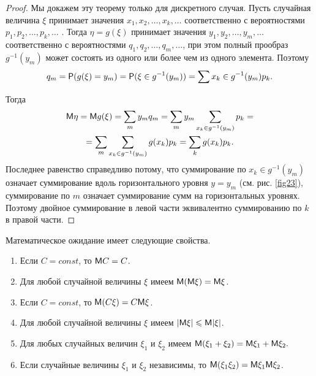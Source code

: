 \begin{proof}
	Мы докажем эту теорему только для дискретного случая.
Пусть случайная величина $\xi$ принимает значения $x_1, x_2,\dots, x_k, \dots$ соответственно с вероятностями $p_1, p_2,\dots , p_k,\dots$ . Тогда $\eta= g(\xi)$ принимает
значения $y_1, y_2, \dots , y_m, \dots$ соответственно с вероятностями $q_1, q_2,\dots, q_m,\dots $, при этом полный прообраз $g^{−1}(y_m)$ может состоять из одного или более чем из одного элемента. Поэтому
	\begin{equation*}
		q_m=\P(g(\xi)=y_m)=\P(\xi\in g^{-1}(y_m))=\sum\limits
		{x_k\in g^{-1}(y_m)}p_k.
	\end{equation*}

	Тогда
	\begin{gather*}
	\M\eta=\M g(\xi)=\sum_m y_mq_m=\sum_m y_m \sum
	\limits_{x_k\in g^{-1}(y_m)} p_k=\\=
	\sum_m\sum\limits_{x_k\in g^{-1}(y_m)}g(x_k)p_k=\sum_kg(x_k)p_k.
	\end{gather*}
	Последнее равенство справедливо потому, что суммирование по $x_k\in g^{-1}(y_m)$ означает суммирование вдоль горизонтального уровня $y = y_m$ (см. рис. \ref{fig23}), суммирование по $m$ означает суммирование сумм на горизонтальных уровнях. Поэтому двойное суммирование в левой части эквивалентно суммированию по $k$ в правой части.
\end{proof}

\begin{theorem}
Математическое ожидание имеет следующие свойства.
\begin{enumerate}
	\item Если $C = const$, то $\M C = C$.
	\item Для любой случайной величины $\xi$ имеем $\M(\M\xi) = \M\xi$.
	\item Если $C = const$, то $\M(C\xi) = C\M\xi$.
	\item Для любой случайной величины $\xi$ имеем $|\M\xi| \leqslant \M|\xi|$. 
	\item Для любых случайных величин $\xi_1$ и $\xi_2$ имеем $\M(\xi_1 + \xi_2) = \M\xi_1 +\M\xi_2.$
	\item Если случайные величины $\xi_1$ и $\xi_2$ независимы, то $\M(\xi_1\xi_2) = \M\xi_1\M\xi_2$.
\end{enumerate}
\end{theorem}

